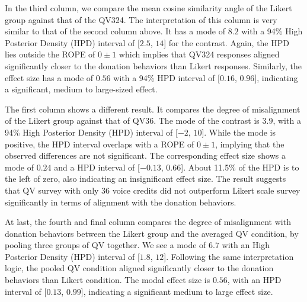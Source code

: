 In the third column, we compare the mean cosine similarity angle of the Likert group
against that of the QV324. The interpretation of this column is very similar to that of the second column above. It has a mode of $8.2$ with a 94\% High Posterior Density (HPD) interval of [$2.5$, $14$] for the contrast. Again, the HPD lies outside the ROPE of $0 \pm 1$ which implies that QV324 responses aligned significantly closer to the donation behaviors than Likert responses. Similarly, the effect size has a mode of $0.56$ with a 94\% HPD interval of [$0.16$, $0.96$], indicating a significant, medium to large-sized effect.

The first column shows a different result. It compares the degree of misalignment of the Likert group against that of QV36. The mode of the contrast is $3.9$, with a 94\% High Posterior Density (HPD) interval of [$-2$, $10$]. While the mode is positive, the HPD interval overlaps with a ROPE of $0 \pm 1$, implying that the observed differences are not significant. The corresponding effect size shows a mode of $0.24$ and a HPD interval of [$-0.13$, $0.66$]. About 11.5\% of the HPD is to the left of zero, also indicating an insignificant effect size. The result suggests that QV survey with only 36 voice credits did not outperform Likert scale survey significantly in terms of alignment with the donation behaviors.

At last, the fourth and final column compares the degree of misalignment with donation behaviors between the Likert group and the averaged QV condition, by pooling three groups of QV together. We see a mode of $6.7$ with an High Posterior Density (HPD) interval of [$1.8$, $12$]. Following the same interpretation logic, the pooled QV condition aligned significantly closer to the donation behaviors than Likert condition. The modal effect size is $0.56$, with an HPD interval of [$0.13$, $0.99$], indicating a significant medium to large effect size.


